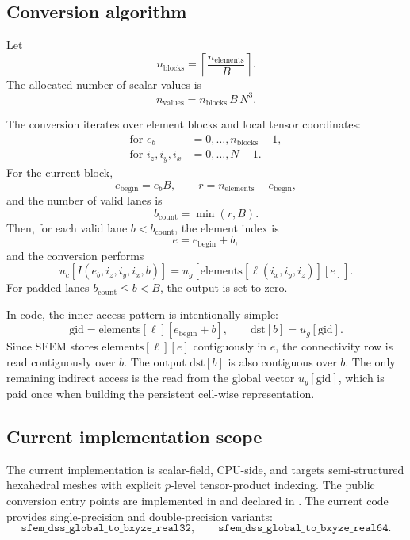 \documentclass[11pt]{article}
\begin{document}
\subsection{Conversion algorithm}

Let
\[
    n_{\mathrm{blocks}} =
    \left\lceil \frac{n_{\mathrm{elements}}}{B} \right\rceil .
\]
The allocated number of scalar values is
\[
    n_{\mathrm{values}} = n_{\mathrm{blocks}}\,B\,N^3.
\]

The conversion iterates over element blocks and local tensor coordinates:
\[
\begin{aligned}
\text{for } e_b &= 0,\ldots,n_{\mathrm{blocks}}-1,\\
\text{for } i_z,i_y,i_x &= 0,\ldots,N-1.
\end{aligned}
\]
For the current block,
\[
    e_{\mathrm{begin}} = e_b B,
    \qquad
    r = n_{\mathrm{elements}} - e_{\mathrm{begin}},
\]
and the number of valid lanes is
\[
    b_{\mathrm{count}} = \min(r,B).
\]
Then, for each valid lane \(b < b_{\mathrm{count}}\), the element index is
\[
    e = e_{\mathrm{begin}} + b,
\]
and the conversion performs
\[
    u_c[I(e_b,i_z,i_y,i_x,b)]
    =
    u_g\left[
        \mathrm{elements}[\ell(i_x,i_y,i_z)][e]
    \right].
\]
For padded lanes \(b_{\mathrm{count}} \le b < B\), the output is set to zero.

In code, the inner access pattern is intentionally simple:
\[
    \mathrm{gid} = \mathrm{elements}[\ell][e_{\mathrm{begin}} + b],
    \qquad
    \mathrm{dst}[b] = u_g[\mathrm{gid}].
\]
Since SFEM stores \(\mathrm{elements}[\ell][e]\) contiguously in \(e\), the
connectivity row is read contiguously over \(b\). The output \(\mathrm{dst}[b]\)
is also contiguous over \(b\). The only remaining indirect access is the read
from the global vector \(u_g[\mathrm{gid}]\), which is paid once when building
the persistent cell-wise representation.

\subsection{Current implementation scope}

The current implementation is scalar-field, CPU-side, and targets
semi-structured hexahedral meshes with explicit \(p\)-level tensor-product
indexing. The public conversion entry points are implemented in
 and declared in
. The current code provides
single-precision and double-precision variants:
\[
    \texttt{sfem\_dss\_global\_to\_bxyze\_real32},
    \qquad
    \texttt{sfem\_dss\_global\_to\_bxyze\_real64}.
\]
\end{document}
